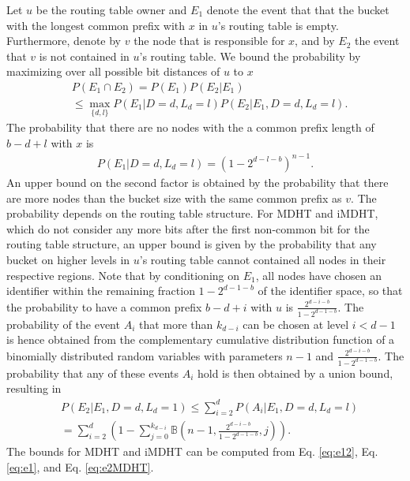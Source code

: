 \documentclass[10pt, conference, compsocconf, letterpaper]{IEEEtran}
\renewcommand{\binom}{\mathbb{B}}
\begin{document}
Let $u$ be the routing table owner and $E_1$ denote the event that
that the bucket with the longest common prefix with $x$ 
in $u$'s routing table is empty. Furthermore, denote by $v$ the node
that is responsible for $x$, and by $E_2$ the event that $v$ is
not contained in $u$'s routing table.
We bound the probability by maximizing over all possible bit distances of $u$ to
$x$ 
\begin{align}
\label{eq:e12}
&P(E_1 \cap E_2) = P(E_1)P(E_2|E_1) \\
&\leq \max_{\{d,l\}} P(E_1|D=d,L_d=l)P(E_2|E_1,D=d,L_d=l). \nonumber
\end{align}
The probability that there are no nodes with the a common prefix length of $b-d+l$ with
$x$ is
\begin{align}
\label{eq:e1}
P(E_1|D=d,L_d=l)=\left( 1 - 2^{d-l-b}\right)^{n-1}.
\end{align}
An upper bound on the second factor is obtained by the
probability that there are more nodes than the bucket size with the same common
prefix as $v$.
The probability depends on the routing table structure.
For MDHT and iMDHT, which do not consider any more bits after the first non-common
bit for the routing table structure, an upper bound is given by the probability
that any bucket on higher levels in $u$'s routing table cannot contained all nodes in their respective regions.
Note that by conditioning on $E_1$, all nodes have chosen an identifier within
the remaining fraction $1-2^{d-1-b}$ of the identifier space,
so that the probability to have a common prefix $b-d+i$ with $u$ is
$\frac{2^{d-i-b}}{1-2^{d-1-b}}$.
The probability of the event $A_i$ that more than $k_{d-i}$ can be chosen at level $i < d-1$ 
is hence obtained from the complementary cumulative distribution function
of a binomially distributed random variables with parameters $n-1$ and
$\frac{2^{d-i-b}}{1-2^{d-1-b}}$. 
The probability that any of these events $A_i$ hold is then obtained by a union
bound, resulting in  
\begin{align}
\label{eq:e2MDHT}
&P(E_2|E_1,D=d,L_d=1) \leq \sum_{i=2}^d P(A_i|E_1,D=d,L_d=l) \\ 
&= \sum_{i=2}^d \left(1 - \sum_{j=0}^{k_{d-i}}\binom(n-1,\frac{2^{d-i-b}}{1-2^{d-1-b}},j)\right). \nonumber
\end{align}
The bounds for MDHT and iMDHT can be computed from Eq. \ref{eq:e12}, Eq. \ref{eq:e1}, and Eq. \ref{eq:e2MDHT}.
\end{document}
